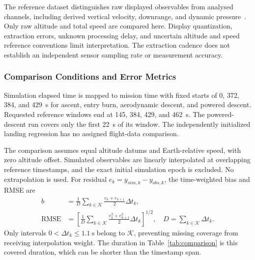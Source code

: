 \documentclass[11pt,letterpaper]{article}
\begin{document}
The reference dataset distinguishes raw displayed observables from analysed channels, including derived vertical velocity, downrange, and dynamic pressure~\cite{telemetry}. Only raw altitude and total speed are compared here. Display quantization, extraction errors, unknown processing delay, and uncertain altitude and speed reference conventions limit interpretation. The extraction cadence does not establish an independent sensor sampling rate or measurement accuracy.

\subsubsection{Comparison Conditions and Error Metrics}
Simulation elapsed time is mapped to mission time with fixed starts of 0, 372, 384, and \SI{429}{\second} for ascent, entry burn, aerodynamic descent, and powered descent. Requested reference windows end at 145, 384, 429, and \SI{462}{\second}. The powered-descent run covers only the first \SI{22}{\second} of its window. The independently initialized landing regression has no assigned flight-data comparison.

The comparison assumes equal altitude datums and Earth-relative speed, with zero altitude offset. Simulated observables are linearly interpolated at overlapping reference timestamps, and the exact initial simulation epoch is excluded. No extrapolation is used. For residual $e_k=y_{sim,k}-y_{obs,k}$, the time-weighted bias and RMSE are
\begin{align}
b&=\frac{1}{D}\sum_{k\in\mathcal K}\frac{e_k+e_{k+1}}{2}\Delta t_k,\\
\operatorname{RMSE}&=\left[\frac{1}{D}\sum_{k\in\mathcal K}
\frac{e_k^2+e_{k+1}^2}{2}\Delta t_k\right]^{1/2},
\quad D=\sum_{k\in\mathcal K}\Delta t_k.
\end{align}
Only intervals $0<\Delta t_k\leq\SI{1.1}{\second}$ belong to $\mathcal K$, preventing missing coverage from receiving interpolation weight. The duration in Table~\ref{tab:comparison} is this covered duration, which can be shorter than the timestamp span.
\end{document}
